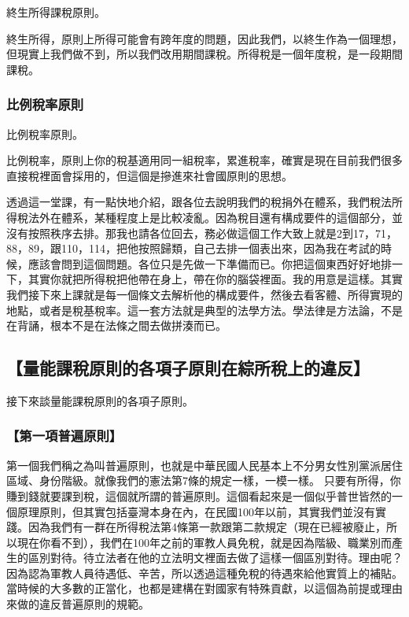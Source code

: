 \documentclass[oneside,sub3section]{ctexbook}
\begin{document}
終生所得課稅原則。

終生所得，原則上所得可能會有跨年度的問題，因此我們，以終生作為一個理想，但現實上我們做不到，所以我們改用期間課稅。所得稅是一個年度稅，是一段期間課稅。

\hypertarget{ux6bd4ux4f8bux7a05ux7387ux539fux5247}{%
\subsubsection{比例稅率原則}\label{ux6bd4ux4f8bux7a05ux7387ux539fux5247}}

比例稅率原則。

比例稅率，原則上你的稅基適用同一組稅率，累進稅率，確實是現在目前我們很多直接稅裡面會採用的，但這個是摻進來社會國原則的思想。

透過這一堂課，有一點快地介紹，跟各位去說明我們的稅捐外在體系，我們稅法所得稅法外在體系，某種程度上是比較凌亂。因為稅目還有構成要件的這個部分，並沒有按照秩序去排。那我也請各位回去，務必做這個工作大致上就是2到17，71，88，89，跟110，114，把他按照歸類，自己去排一個表出來，因為我在考試的時候，應該會問到這個問題。各位只是先做一下準備而已。你把這個東西好好地排一下，其實你就把所得稅把他帶在身上，帶在你的腦袋裡面。我的用意是這樣。其實我們接下來上課就是每一個條文去解析他的構成要件，然後去看客體、所得實現的地點，或者是稅基稅率。這一套方法就是典型的法學方法。學法律是方法論，不是在背誦，根本不是在法條之間去做拼湊而已。

\hypertarget{ux91cfux80fdux8ab2ux7a05ux539fux5247ux7684ux5404ux9805ux5b50ux539fux5247ux5728ux7d9cux6240ux7a05ux4e0aux7684ux9055ux53cd}{%
\subsection{【量能課稅原則的各項子原則在綜所稅上的違反】}\label{ux91cfux80fdux8ab2ux7a05ux539fux5247ux7684ux5404ux9805ux5b50ux539fux5247ux5728ux7d9cux6240ux7a05ux4e0aux7684ux9055ux53cd}}

接下來談量能課稅原則的各項子原則。

\hypertarget{ux7b2cux4e00ux9805ux666eux904dux539fux5247}{%
\subsubsection{【第一項普遍原則】}\label{ux7b2cux4e00ux9805ux666eux904dux539fux5247}}

第一個我們稱之為叫普遍原則，也就是中華民國人民基本上不分男女性別黨派居住區域、身份階級。就像我們的憲法第7條的規定一樣，一模一樣。
只要有所得，你賺到錢就要課到稅，這個就所謂的普遍原則。這個看起來是一個似乎普世皆然的一個原理原則，但其實包括臺灣本身在內，在民國100年以前，其實我們並沒有實踐。因為我們有一群在所得稅法第4條第一款跟第二款規定（現在已經被廢止，所以現在你看不到），我們在100年之前的軍教人員免稅，就是因為階級、職業別而產生的區別對待。待立法者在他的立法明文裡面去做了這樣一個區別對待。理由呢？因為認為軍教人員待遇低、辛苦，所以透過這種免稅的待遇來給他實質上的補貼。當時候的大多數的正當化，也都是建構在對國家有特殊貢獻，以這個為前提或理由來做的違反普遍原則的規範。
\end{document}
